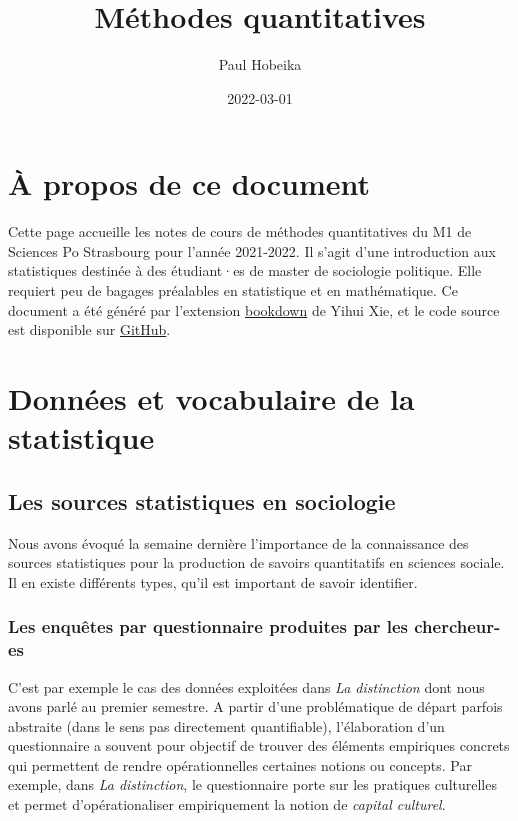 \documentclass[
  french,
]{book}
\title{Méthodes quantitatives}
\author{Paul Hobeika}
\date{2022-03-01}
\begin{document}
\maketitle

{
\setcounter{tocdepth}{1}
\tableofcontents
}
\hypertarget{uxe0-propos-de-ce-document}{%
\chapter*{À propos de ce document}\label{uxe0-propos-de-ce-document}}

Cette page accueille les notes de cours de méthodes quantitatives du M1 de Sciences Po Strasbourg pour l'année 2021-2022. Il s'agit d'une introduction aux statistiques destinée à des étudiant·es de master de sociologie politique. Elle requiert peu de bagages préalables en statistique et en mathématique. Ce document a été généré par l'extension \href{https://bookdown.org/}{bookdown} de Yihui Xie, et le code source est disponible sur \href{https://github.com/phobeika/quanti}{GitHub}.

\hypertarget{donnuxe9es-et-vocabulaire-de-la-statistique}{%
\chapter{Données et vocabulaire de la statistique}\label{donnuxe9es-et-vocabulaire-de-la-statistique}}

\hypertarget{les-sources-statistiques-en-sociologie}{%
\section{Les sources statistiques en sociologie}\label{les-sources-statistiques-en-sociologie}}

Nous avons évoqué la semaine dernière l'importance de la connaissance des sources statistiques pour la production de savoirs quantitatifs en sciences sociale. Il en existe différents types, qu'il est important de savoir identifier.

\hypertarget{les-enquuxeates-par-questionnaire-produites-par-les-chercheur-es}{%
\subsection{Les enquêtes par questionnaire produites par les chercheur-es}\label{les-enquuxeates-par-questionnaire-produites-par-les-chercheur-es}}

C'est par exemple le cas des données exploitées dans \emph{La distinction} \citep{bourdieu1979} dont nous avons parlé au premier semestre. A partir d'une problématique de départ parfois abstraite (dans le sens pas directement quantifiable), l'élaboration d'un questionnaire a souvent pour objectif de trouver des éléments empiriques concrets qui permettent de rendre opérationnelles certaines notions ou concepts. Par exemple, dans \emph{La distinction}, le questionnaire porte sur les pratiques culturelles et permet d'opérationaliser empiriquement la notion de \emph{capital culturel}.
\end{document}
